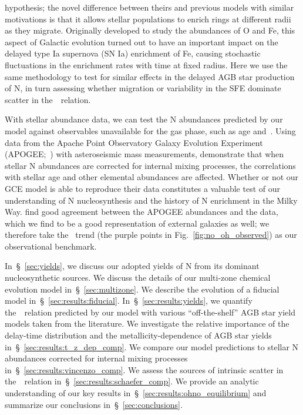 \documentclass[ms.tex]{subfiles}
\begin{document}
hypothesis; the novel difference between theirs and previous models with
similar motivations is that it allows stellar populations to enrich
rings at different radii as they migrate.
Originally developed to study the abundances of O and Fe, this aspect of
Galactic evolution turned out to have an important impact on the delayed type
Ia supernova (SN Ia) enrichment of Fe, causing stochastic fluctuations in the
enrichment rates with time at fixed radius.
Here we use the same methodology to test for similar effects in the delayed AGB
star production of N, in turn assessing whether migration or variability in the
SFE dominate scatter in the~\ohno~relation.
\par
With stellar abundance data, we can test the N abundances predicted by our
model against observables unavailable for the gas phase, such as age and~\ofe.
Using data from the Apache Point Observatory Galaxy Evolution Experiment
(APOGEE;~\citealp{Majewski2017}) with asteroseismic mass measurements,
\citet{Vincenzo2021} demonstrate that when stellar N abundances are corrected
for internal mixing processes, the correlations with stellar age and other
elemental abundances are affected.
Whether or not our GCE model is able to reproduce their data constitutes a
valuable test of our understanding of N nucleosynthesis and the history of N
enrichment in the Milky Way.
\citet{Vincenzo2021} find good agreement between the APOGEE abundances and the
\citet{Dopita2016} data, which we find to be a good representation of external
galaxies as well; we therefore take the~\citet{Dopita2016} trend (the purple
points in Fig.~\ref{fig:no_oh_observed}) as our observational benchmark.
\par
In~\S~\ref{sec:yields}, we discuss our adopted yields of N from its dominant
nucleosynthetic sources.
We discuss the details of our multi-zone chemical evolution model
in~\S~\ref{sec:multizone}.
We describe the evolution of a fiducial model in~\S~\ref{sec:results:fiducial}.
In~\S~\ref{sec:results:yields}, we quantify the~\ohno~relation predicted by our
model with various ``off-the-shelf'' AGB star yield models taken from the
literature.
We investigate the relative importance of the delay-time distribution and the
metallicity-dependence of AGB star yields in~\S~\ref{sec:results:t_z_dep_comp}.
We compare our model predictions to stellar N abundances corrected for internal
mixing processes in~\S~\ref{sec:results:vincenzo_comp}.
We assess the sources of intrinsic scatter in the~\ohno~relation
in~\S~\ref{sec:results:schaefer_comp}.
We provide an analytic understanding of our key results
in~\S~\ref{sec:results:ohno_equilibrium} and summarize our conclusions
in~\S~\ref{sec:conclusions}.
\end{document}
